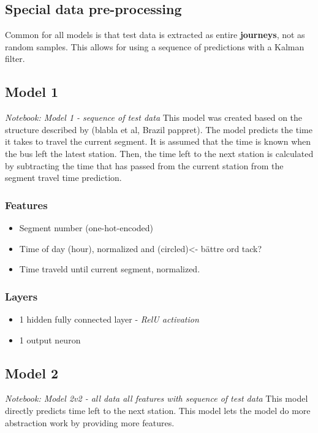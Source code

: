 \subsection{Special data pre-processing}
Common for all models is that test data is extracted as entire \textbf{journeys}, not as random samples. This allows for using a sequence of predictions with a Kalman filter.

\subsection{Model 1}\label{M1}
\textit{Notebook: Model 1 - sequence of test data}
\newline
\noindent This model was created based on the structure described by (blabla et al, Brazil pappret). The model predicts the time it takes to travel the current segment. It is assumed that the time is known when the bus left the latest station. Then, the time left to the next station is calculated by subtracting the time that has passed from the current station from the segment travel time prediction.

\subsubsection{Features}

\begin{itemize}
    \item Segment number (one-hot-encoded)
    \item Time of day (hour), normalized and (circled)<- bättre ord tack?
    \item Time traveld until current segment, normalized.    
\end{itemize}

\subsubsection{Layers}

\begin{itemize}
    \item 1 hidden fully connected layer - \textit{RelU activation}
    \item 1 output neuron
\end{itemize}


\subsection{Model 2}\label{M2}
\textit{Notebook: Model 2v2 - all data all features with sequence of test data}
\noindent This model directly predicts time left to the next station. This model lets the model do more abstraction work by providing more features. 

